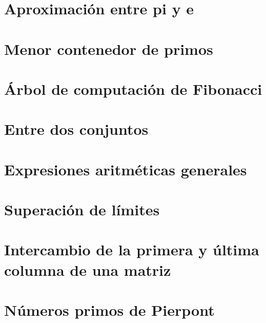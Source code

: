 \documentclass[a4paper,12pt,twoside]{book}
\begin{document}
\chapter{Aproximación entre pi y e}
\label{071218}


\chapter{Menor contenedor de primos}
\label{101218}

\chapter{Árbol de computación de Fibonacci}
\label{111218}

\chapter{Entre dos conjuntos}
\label{121218}

\chapter{Expresiones aritméticas generales}
\label{131218}

\chapter{Superación de límites}
\label{141218}


\chapter{Intercambio de la primera y última columna de
  una matriz}
\label{171218}

\chapter{Números primos de Pierpont}
\label{181218}
\end{document}
